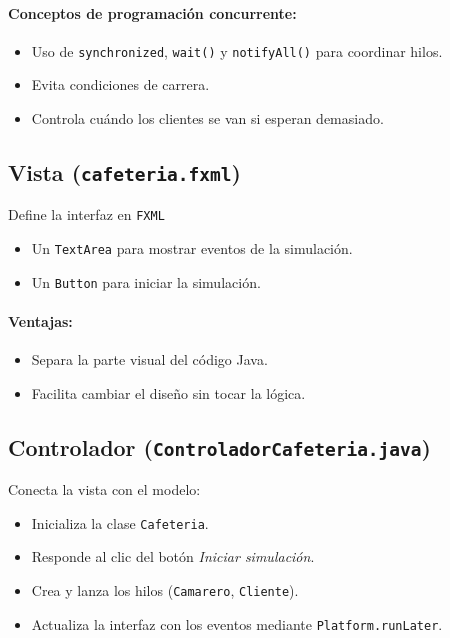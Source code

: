 \documentclass[12pt,a4paper]{article}
\begin{document}
\paragraph{Conceptos de programación concurrente:}
\begin{itemize}
    \item Uso de \texttt{synchronized}, \texttt{wait()} y \texttt{notifyAll()} para coordinar hilos.
    \item Evita condiciones de carrera.
    \item Controla cuándo los clientes se van si esperan demasiado.
\end{itemize}

\subsection{Vista (\texttt{cafeteria.fxml})}

Define la interfaz en \texttt{FXML}
\begin{itemize}
    \item Un \texttt{TextArea} para mostrar eventos de la simulación.
    \item Un \texttt{Button} para iniciar la simulación.
\end{itemize}

\paragraph{Ventajas:}
\begin{itemize}
    \item Separa la parte visual del código Java.
    \item Facilita cambiar el diseño sin tocar la lógica.
\end{itemize}

\subsection{Controlador (\texttt{ControladorCafeteria.java})}

Conecta la vista con el modelo:
\begin{itemize}
    \item Inicializa la clase \texttt{Cafeteria}.
    \item Responde al clic del botón \textit{Iniciar simulación}.
    \item Crea y lanza los hilos (\texttt{Camarero}, \texttt{Cliente}).
    \item Actualiza la interfaz con los eventos mediante \texttt{Platform.runLater}.
\end{itemize}
\end{document}
